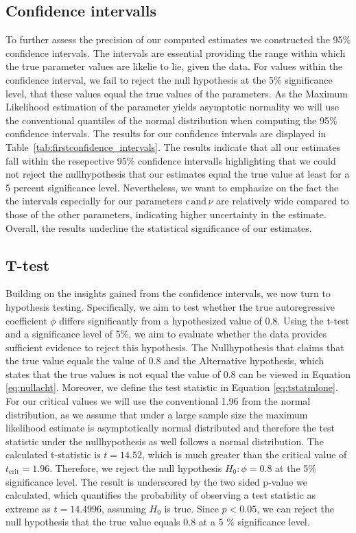 \documentclass[12pt]{article}
\begin{document}
\subsection{Confidence intervalls}
To further assess the precision of our computed estimates we constructed the 95\% confidence intervals.
The intervals are essential providing the range within which the true parameter values are likelie to lie, given the data.
For values within the confidence interval, we fail to reject the null hypothesis at the 5\% significance level, that these values equal the true values of the parameters.
As the Maximum Likelihood estimation of the parameter yields asymptotic normality we will use the conventional quantiles of the normal distribution when computing the 95\% confidence intervals.
The results for our confidence intervals are displayed in Table~\ref{tab:firstconfidence_intervals}.
The results indicate that all our estimates fall within the resepective 95\% confidence intervalls highlighting that we could not reject the nullhypothesis that our estimates equal the true value at least for a 5 percent significance level.
Nevertheless, we want to emphasize on the fact the the intervals especially for our parameters $c \, \text{and} \, \nu$ are relatively wide compared to those of the other parameters, indicating higher uncertainty in the estimate.
Overall, the results underline the statistical significance of our estimates.
\subsection{T-test}
Building on the insights gained from the confidence intervals, we now turn to hypothesis testing.
Specifically, we aim to test whether the true autoregressive coefficient $\phi$ differs significantly from a hypothesized value of 0.8.
Using the t-test and a significance level of 5\%, we aim to evaluate whether the data provides sufficient evidence to reject this hypothesis.
The Nullhypothesis that claims that the true value equals the value of 0.8 and the Alternative hypothesis, which states that the true values is not equal the value of 0.8 can be viewed in Equation \ref{eq:nullacht}. Moreover, we define the test statistic in Equation \ref{eq:tstatmlone}.
For our critical values we will use the conventional 1.96 from the normal distribution, as we assume that under a large sample size the maximum likelihood estimate is asymptotically normal distributed and therefore the test statistic under the nullhypothesis as well follows a normal distribution.
The calculated t-statistic is \( t = 14.52 \), which is much greater than the critical value of \( t_{\text{crit}} = 1.96 \). Therefore, we  reject the null hypothesis \( H_0: \phi = 0.8 \) at the 5\% significance level.
The result is underscored by the two sided p-value we calculated, which quantifies the probability of observing a test statistic as extreme as \( t = 14.4996 \), assuming \( H_0 \) is true.
Since \( p < 0.05 \), we can reject the null hypothesis that the true value equals 0.8 at a 5 \% significance level. 
\end{document}
